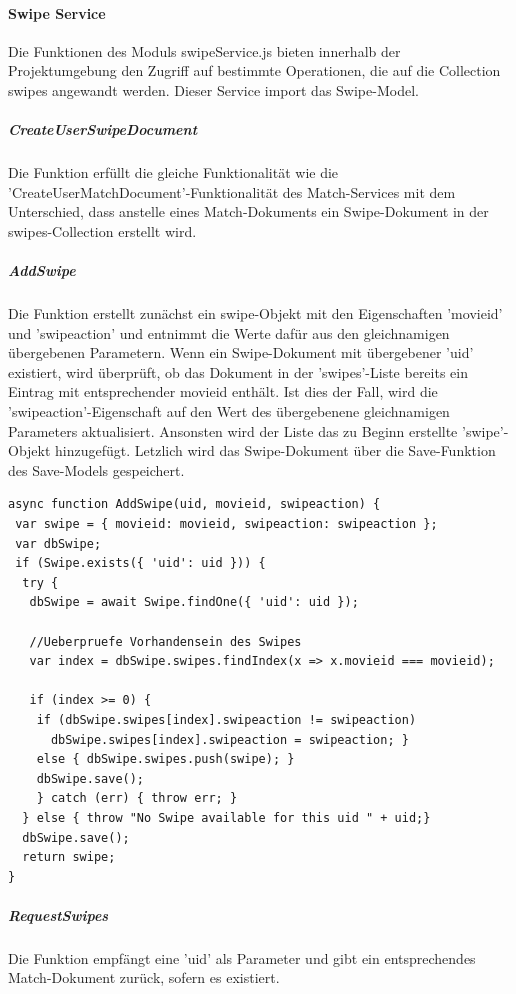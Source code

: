 %
%

\paragraph{Swipe Service}
Die Funktionen des Moduls swipeService.js bieten innerhalb der Projektumgebung den Zugriff auf bestimmte Operationen, die auf die Collection swipes angewandt werden. Dieser Service import das Swipe-Model.

\noindent
\subparagraph{CreateUserSwipeDocument}
Die Funktion erfüllt die gleiche Funktionalität wie die 'Create\-UserMatchDocument'-Funktionalität des Match-Services mit dem Unterschied, dass anstelle eines Match-Dokuments ein Swipe-Dokument in der swipes-Collection erstellt wird.

\noindent
\subparagraph{AddSwipe}
Die Funktion erstellt zunächst ein swipe-Objekt mit den Eigenschaften 'movieid' und 'swipeaction' und entnimmt die Werte dafür aus den gleichnamigen übergebenen Parametern. 
Wenn ein Swipe-Dokument mit übergebener 'uid' existiert, wird überprüft, ob das Dokument in der 'swipes'-Liste bereits ein Eintrag mit entsprechender movieid enthält. Ist dies der Fall, wird die 'swipeaction'-Eigenschaft auf den Wert des übergebenene gleichnamigen Parameters aktualisiert. Ansonsten wird der Liste das zu Beginn erstellte 'swipe'-Objekt hinzugefügt. Letzlich wird das Swipe-Dokument über die Save-Funktion des Save-Models gespeichert.

\begin{lstlisting}[caption=Swipe Service - AddSwipe, label=lst:swipeserviceaddswipe]
async function AddSwipe(uid, movieid, swipeaction) {
 var swipe = { movieid: movieid, swipeaction: swipeaction };
 var dbSwipe;
 if (Swipe.exists({ 'uid': uid })) {
  try {
   dbSwipe = await Swipe.findOne({ 'uid': uid });

   //Ueberpruefe Vorhandensein des Swipes
   var index = dbSwipe.swipes.findIndex(x => x.movieid === movieid);

   if (index >= 0) {
    if (dbSwipe.swipes[index].swipeaction != swipeaction)
      dbSwipe.swipes[index].swipeaction = swipeaction; }
    else { dbSwipe.swipes.push(swipe); }
    dbSwipe.save(); 
    } catch (err) { throw err; }
  } else { throw "No Swipe available for this uid " + uid;}
  dbSwipe.save();
  return swipe;
}
\end{lstlisting}

\noindent
\subparagraph{RequestSwipes}
Die Funktion empfängt eine 'uid' als Parameter und gibt ein entsprechendes Match-Dokument zurück, sofern es existiert.

